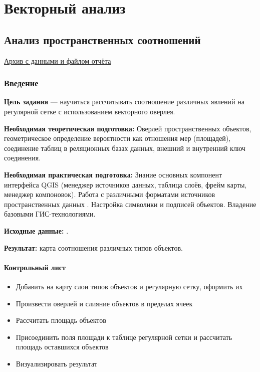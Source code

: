\documentclass[
  12pt,
]{book}
\providecommand{\tightlist}{%
  \setlength{\itemsep}{0pt}\setlength{\parskip}{0pt}}
\begin{document}
\hypertarget{part-ux432ux435ux43aux442ux43eux440ux43dux44bux439-ux430ux43dux430ux43bux438ux437-1}{%
\part{Векторный анализ}\label{part-ux432ux435ux43aux442ux43eux440ux43dux44bux439-ux430ux43dux430ux43bux438ux437-1}}

\hypertarget{spatrelations}{%
\chapter{Анализ пространственных соотношений}\label{spatrelations}}

\href{}{Архив с данными и файлом отчёта}

\hypertarget{spatrelations-intro}{%
\section{Введение}\label{spatrelations-intro}}

\textbf{Цель задания} --- научиться рассчитывать соотношение различных явлений на регулярной сетке с использованием векторного оверлея.

\textbf{Необходимая теоретическая подготовка:} Оверлей пространственных объектов, геометрическое определение вероятности как отношения мер (площадей), соединение таблиц в реляционных базах данных, внешний и внутренний ключ соединения.

\textbf{Необходимая практическая подготовка:} Знание основных компонент интерфейса QGIS (менеджер источников данных, таблица слоёв, фрейм карты, менеджер компоновок). Работа с различными форматами источников пространственных данных . Настройка символики и подписей объектов. Владение базовыми ГИС-технологиями.

\textbf{Исходные данные:} .

\textbf{Результат:} карта соотношения различных типов объектов.

\hypertarget{spatrelations-control}{%
\subsection{Контрольный лист}\label{spatrelations-control}}

\begin{itemize}
\tightlist
\item
  Добавить на карту слои типов объектов и регулярную сетку, оформить их
\item
  Произвести оверлей и слияние объектов в пределах ячеек
\item
  Рассчитать площадь объектов
\item
  Присоединить поля площади к таблице регулярной сетки и рассчитать площадь оставшихся объектов
\item
  Визуализировать результат
\end{itemize}
\end{document}
